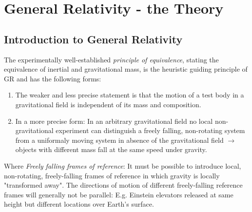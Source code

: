 \chapter{General Relativity - the Theory}

\label{ch:GRtheory}
\section{Introduction to General Relativity}
The experimentally well-established \emph{principle of equivalence}, stating the equivalence of inertial and gravitational mass, is the heuristic guiding principle of GR and has the following forms:
\begin{enumerate}
	\item The weaker and less precise statement is that the motion of a test body in a gravitational field is independent of its mass and composition.
	\item In a more precise form: In an arbitrary gravitational field no local non-gravitational experiment can distinguish a freely falling, non-rotating system from a uniformaly moving system in absence of the gravitational field $\rightarrow$ objects with different mass fall at the same speed under gravity.
\end{enumerate}

Where \emph{Freely falling frames of reference}:
It must be possible to introduce local, non-rotating, freely-falling frames of reference in which gravity is locally "transformed away".
The directions of motion of different freely-falling reference frames will generally not be parallel: E.g. Einstein elevators released at same height but different locations over Earth's surface.
